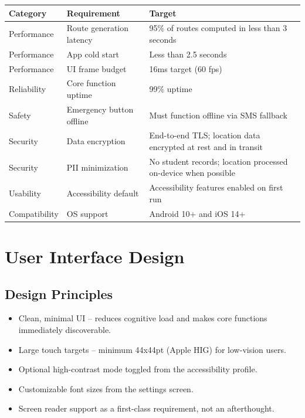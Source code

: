 \documentclass[12pt]{article}
\begin{document}
\begin{tabularx}{\textwidth}{|l|l|X|}
\hline
\textbf{Category} & \textbf{Requirement} & \textbf{Target} \\
\hline
Performance & Route generation latency & 95\% of routes computed in less than 3 seconds \\
\hline
Performance & App cold start & Less than 2.5 seconds \\
\hline
Performance & UI frame budget & 16ms target (60 fps) \\
\hline
Reliability & Core function uptime & 99\% uptime \\
\hline
Safety & Emergency button offline & Must function offline via SMS fallback \\
\hline
Security & Data encryption & End-to-end TLS; location data encrypted at rest and in transit \\
\hline
Security & PII minimization & No student records; location processed on-device when possible \\
\hline
Usability & Accessibility default & Accessibility features enabled on first run \\
\hline
Compatibility & OS support & Android 10+ and iOS 14+ \\
\hline
\end{tabularx}

\section{User Interface Design}

\subsection{Design Principles}
\begin{itemize}
    \item Clean, minimal UI -- reduces cognitive load and makes core functions immediately discoverable.
    \item Large touch targets -- minimum 44x44pt (Apple HIG) for low-vision users.
    \item Optional high-contrast mode toggled from the accessibility profile.
    \item Customizable font sizes from the settings screen.
    \item Screen reader support as a first-class requirement, not an afterthought.
\end{itemize}
\end{document}
